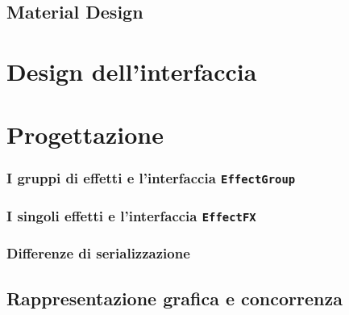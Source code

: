 \subsection{Material Design}\label{sub:material}
\section{Design dell'interfaccia}\label{sec:design}
\section{Progettazione}\label{sec:progettazione}
\subsubsection{I gruppi di effetti e l'interfaccia \texttt{EffectGroup}}\label{subsub:effectGroup}
\subsubsection{I singoli effetti e l'interfaccia \texttt{EffectFX}}\label{subsub:effectFX}
\subsubsection{}
\subsubsection{Differenze di serializzazione}\label{subsub:serializzazione}
\subsection{Rappresentazione grafica e concorrenza}\label{sub:rappresentazione}
